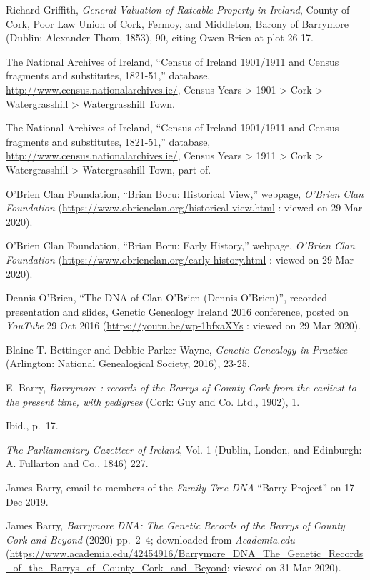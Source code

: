 \begin{thebibliography}{999}
Richard Griffith, \textit{General Valuation of Rateable Property in Ireland}, County of Cork, Poor Law Union of Cork, Fermoy, and Middleton, Barony of Barrymore (Dublin: Alexander Thom, 1853), 90, citing Owen Brien at plot 26-17.

The National Archives of Ireland, ``Census of Ireland 1901/1911 and Census fragments and substitutes, 1821-51,'' database, \url{http://www.census.nationalarchives.ie/}, Census Years > 1901 > Cork > Watergrasshill > Watergrasshill Town.

The National Archives of Ireland, ``Census of Ireland 1901/1911 and Census fragments and substitutes, 1821-51,'' database, \url{http://www.census.nationalarchives.ie/}, Census Years > 1911 > Cork > Watergrasshill > Watergrasshill Town, part of.
	
	O'Brien Clan Foundation, ``Brian Boru: Historical View,'' webpage, \textit{O'Brien Clan Foundation} (\url{https://www.obrienclan.org/historical-view.html} : viewed on 29 Mar 2020).
	
	O'Brien Clan Foundation, ``Brian Boru: Early History,'' webpage, \textit{O'Brien Clan Foundation} (\url{https://www.obrienclan.org/early-history.html} : viewed on 29 Mar 2020).	
	
	Dennis O'Brien, ``The DNA of Clan O'Brien (Dennis O'Brien)'', recorded presentation and slides, Genetic Genealogy Ireland 2016 conference, posted on \textit{YouTube} 29 Oct 2016 (\url{https://youtu.be/wp-1bfxaXYs} : viewed on 29 Mar 2020).
	
	Blaine T. Bettinger and Debbie Parker Wayne, \textit{Genetic Genealogy in Practice} (Arlington: National Genealogical Society, 2016), 23-25.
	
	E. Barry, \textit{Barrymore : records of the Barrys of County Cork from the earliest to the present time, with pedigrees} (Cork: Guy and Co. Ltd., 1902), 1.
	
	Ibid., p.\ 17.
	
	\textit{The Parliamentary Gazetteer of Ireland}, Vol. 1 (Dublin, London, and Edinburgh: A. Fullarton and Co., 1846) 227.
	
	James Barry, email to members of the \textit{Family Tree DNA} ``Barry Project'' on 17 Dec 2019.
	
	James Barry, \textit{Barrymore DNA: The Genetic Records of the Barrys of County Cork and Beyond} (2020) pp.\ 2--4; downloaded from \textit{Academia.edu} (\url{https://www.academia.edu/42454916/Barrymore_DNA_The_Genetic_Records_of_the_Barrys_of_County_Cork_and_Beyond}: viewed on 31 Mar 2020).
	

\end{thebibliography}

